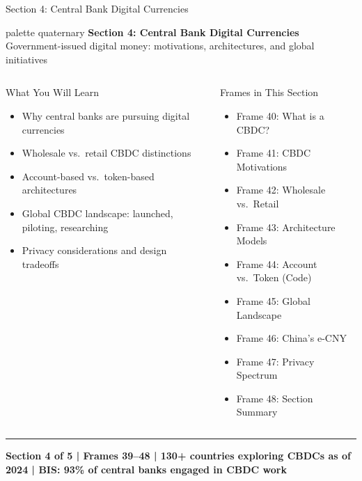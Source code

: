 \documentclass[8pt,aspectratio=169]{beamer}
\newcommand{\bottomnote}[1]{\vfill\vspace{-2mm}\textcolor{mllavender2}{\rule{\textwidth}{0.4pt}}\vspace{1mm}\footnotesize\textbf{#1}}
\begin{document}
\begin{frame}{Section 4: Central Bank Digital Currencies}
\begin{beamercolorbox}[sep=12pt,center,rounded=true,shadow=true]{palette quaternary}
  {\Large\bfseries Section 4: Central Bank Digital Currencies}\\[4pt]
  {\normalsize Government-issued digital money: motivations, architectures, and global initiatives}
\end{beamercolorbox}

\vspace{4mm}
\begin{columns}[T]
\begin{block}{What You Will Learn}
\begin{itemize}\setlength{\itemsep}{2pt}
  \item Why central banks are pursuing digital currencies
  \item Wholesale vs.\ retail CBDC distinctions
  \item Account-based vs.\ token-based architectures
  \item Global CBDC landscape: launched, piloting, researching
  \item Privacy considerations and design tradeoffs
\end{itemize}
\end{block}
\begin{block}{Frames in This Section}
\begin{itemize}\setlength{\itemsep}{2pt}
  \item Frame 40: What is a CBDC?
  \item Frame 41: CBDC Motivations
  \item Frame 42: Wholesale vs.\ Retail
  \item Frame 43: Architecture Models
  \item Frame 44: Account vs.\ Token (Code)
  \item Frame 45: Global Landscape
  \item Frame 46: China's e-CNY
  \item Frame 47: Privacy Spectrum
  \item Frame 48: Section Summary
\end{itemize}
\end{block}
\end{columns}
\bottomnote{Section 4 of 5 | Frames 39--48 | 130+ countries exploring CBDCs as of 2024 | BIS: 93\% of central banks engaged in CBDC work}
\end{frame}
\end{document}
